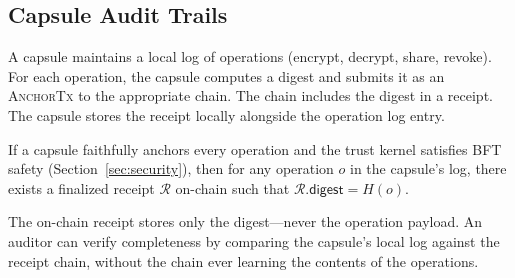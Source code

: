 \subsection{Capsule Audit Trails}

A capsule maintains a local log of operations (encrypt, decrypt, share, revoke).
For each operation, the capsule computes a digest and submits it as an
\textsc{AnchorTx} to the appropriate chain. The chain includes the digest in a
receipt. The capsule stores the receipt locally alongside the operation log entry.

\begin{theorem}\label{thm:audit}
If a capsule faithfully anchors every operation and the trust kernel satisfies
BFT safety (Section~\ref{sec:security}), then for any operation $o$ in the
capsule's log, there exists a finalized receipt $\mathcal{R}$ on-chain such that
$\mathcal{R}.\mathsf{digest} = H(o)$.
\end{theorem}

The on-chain receipt stores only the digest---never the operation payload. An
auditor can verify completeness by comparing the capsule's local log against the
receipt chain, without the chain ever learning the contents of the operations.

